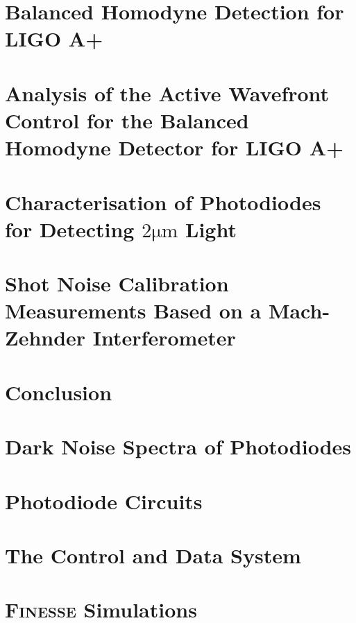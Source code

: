 \documentclass[12pt,twoside, openright]{book}
\begin{document}
\chapter{Balanced Homodyne Detection for LIGO A+}
\label{chapter:BHD_for_ligo_1}

\chapter{Analysis of the Active Wavefront Control for the Balanced Homodyne Detector for LIGO A+}
\label{chapter:BHD_for_ligo_2}

\chapter{Characterisation of Photodiodes for Detecting $2\si{\micro\metre}$ Light}
\label{chapter:2um_photoiode_chapter}

\chapter{Shot Noise Calibration Measurements Based on a Mach-Zehnder Interferometer}
\label{chapter:in_air_MZ}

%
\chapter{Conclusion}
\label{chapter:Conclusion}

\appendix
\chapter{Dark Noise Spectra of Photodiodes}

\chapter{Photodiode Circuits}

\chapter{The Control and Data System}
\label{app:CDS}

\chapter{\textsc{Finesse} Simulations} 
\label{app:appendix_to_SRC_finesse_investigation}

\end{document}
